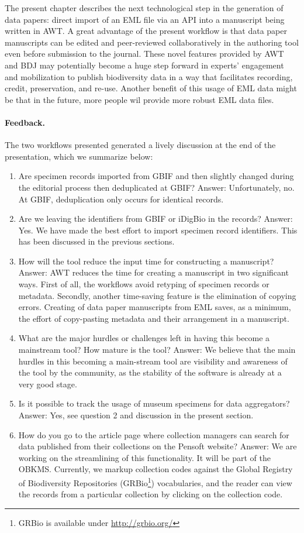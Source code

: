 The present chapter describes the next technological step in the generation of data papers: direct import of an EML file via an API into a manuscript being written in AWT. A great advantage of the present workflow is that data paper manuscripts can be edited and peer-reviewed collaboratively in the authoring tool even before submission to the journal. These novel features provided by AWT and BDJ may potentially become a huge step forward in experts' engagement and mobilization to publish biodiversity data in a way that facilitates recording, credit, preservation, and re-use. Another benefit of this usage of EML data might be that in the future, more people wil provide more robust EML data files.

\paragraph{Feedback.} The two workflows presented generated a lively discussion at the end of the presentation, which we summarize below:

\begin{enumerate}
\item{Are specimen records imported from GBIF and then slightly changed during the editorial process then deduplicated at GBIF? Answer: Unfortunately, no. At GBIF, deduplication only occurs for identical records.}
\item{Are we leaving the identifiers from GBIF or iDigBio in the records? Answer: Yes. We have made the best effort to import specimen record identifiers. This has been discussed in the previous sections.}
\item{How will the tool reduce the input time for constructing a manuscript? Answer: AWT reduces the time for creating a manuscript in two significant ways. First of all, the workflows avoid retyping of specimen records or metadata. Secondly, another time-saving feature is the elimination of copying errors. Creating of data paper manuscripts from EML saves, as a minimum, the effort of copy-pasting metadata and their arrangement in a manuscript.}
\item{What are the major hurdles or challenges left in having this become a mainstream tool? How mature is the tool? Answer: We believe that the main hurdles in this becoming a main-stream tool are visibility and awareness of the tool by the community, as the stability of the software is already at a very good stage.}
\item{Is it possible to track the usage of museum specimens for data aggregators? Answer: Yes, see question 2 and discussion in the present section.}
\item{How do you go to the article page where collection managers can search for data published from their collections on the Pensoft website? Answer: We are working on the streamlining of this functionality. It will be part of the OBKMS. Currently, we markup collection codes against the Global Registry of Biodiversity Repositories (GRBio\footnote{GRBio is available under \url{http://grbio.org/}}) vocabularies, and the reader can view the records from a particular collection by clicking on the collection code.}
\end{enumerate}